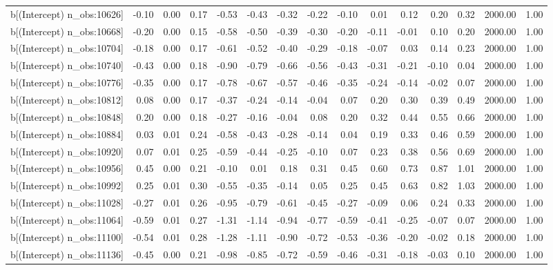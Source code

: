 \begin{table}[ht]
\begin{tabular}{rrrrrrrrrrrrrrr}
  b[(Intercept) n\_obs:10626] & -0.10 & 0.00 & 0.17 & -0.53 & -0.43 & -0.32 & -0.22 & -0.10 & 0.01 & 0.12 & 0.20 & 0.32 & 2000.00 & 1.00 \\ 
  b[(Intercept) n\_obs:10668] & -0.20 & 0.00 & 0.15 & -0.58 & -0.50 & -0.39 & -0.30 & -0.20 & -0.11 & -0.01 & 0.10 & 0.20 & 2000.00 & 1.00 \\ 
  b[(Intercept) n\_obs:10704] & -0.18 & 0.00 & 0.17 & -0.61 & -0.52 & -0.40 & -0.29 & -0.18 & -0.07 & 0.03 & 0.14 & 0.23 & 2000.00 & 1.00 \\ 
  b[(Intercept) n\_obs:10740] & -0.43 & 0.00 & 0.18 & -0.90 & -0.79 & -0.66 & -0.56 & -0.43 & -0.31 & -0.21 & -0.10 & 0.04 & 2000.00 & 1.00 \\ 
  b[(Intercept) n\_obs:10776] & -0.35 & 0.00 & 0.17 & -0.78 & -0.67 & -0.57 & -0.46 & -0.35 & -0.24 & -0.14 & -0.02 & 0.07 & 2000.00 & 1.00 \\ 
  b[(Intercept) n\_obs:10812] & 0.08 & 0.00 & 0.17 & -0.37 & -0.24 & -0.14 & -0.04 & 0.07 & 0.20 & 0.30 & 0.39 & 0.49 & 2000.00 & 1.00 \\ 
  b[(Intercept) n\_obs:10848] & 0.20 & 0.00 & 0.18 & -0.27 & -0.16 & -0.04 & 0.08 & 0.20 & 0.32 & 0.44 & 0.55 & 0.66 & 2000.00 & 1.00 \\ 
  b[(Intercept) n\_obs:10884] & 0.03 & 0.01 & 0.24 & -0.58 & -0.43 & -0.28 & -0.14 & 0.04 & 0.19 & 0.33 & 0.46 & 0.59 & 2000.00 & 1.00 \\ 
  b[(Intercept) n\_obs:10920] & 0.07 & 0.01 & 0.25 & -0.59 & -0.44 & -0.25 & -0.10 & 0.07 & 0.23 & 0.38 & 0.56 & 0.69 & 2000.00 & 1.00 \\ 
  b[(Intercept) n\_obs:10956] & 0.45 & 0.00 & 0.21 & -0.10 & 0.01 & 0.18 & 0.31 & 0.45 & 0.60 & 0.73 & 0.87 & 1.01 & 2000.00 & 1.00 \\ 
  b[(Intercept) n\_obs:10992] & 0.25 & 0.01 & 0.30 & -0.55 & -0.35 & -0.14 & 0.05 & 0.25 & 0.45 & 0.63 & 0.82 & 1.03 & 2000.00 & 1.00 \\ 
  b[(Intercept) n\_obs:11028] & -0.27 & 0.01 & 0.26 & -0.95 & -0.79 & -0.61 & -0.45 & -0.27 & -0.09 & 0.06 & 0.24 & 0.33 & 2000.00 & 1.00 \\ 
  b[(Intercept) n\_obs:11064] & -0.59 & 0.01 & 0.27 & -1.31 & -1.14 & -0.94 & -0.77 & -0.59 & -0.41 & -0.25 & -0.07 & 0.07 & 2000.00 & 1.00 \\ 
  b[(Intercept) n\_obs:11100] & -0.54 & 0.01 & 0.28 & -1.28 & -1.11 & -0.90 & -0.72 & -0.53 & -0.36 & -0.20 & -0.02 & 0.18 & 2000.00 & 1.00 \\ 
  b[(Intercept) n\_obs:11136] & -0.45 & 0.00 & 0.21 & -0.98 & -0.85 & -0.72 & -0.59 & -0.46 & -0.31 & -0.18 & -0.03 & 0.10 & 2000.00 & 1.00 \\ 

\end{tabular}
\end{table}
